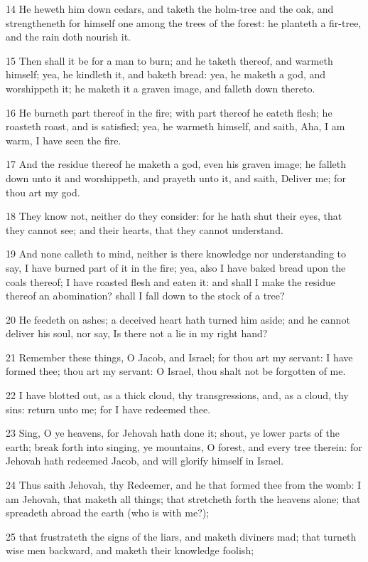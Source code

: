 \par 14 He heweth him down cedars, and taketh the holm-tree and the oak, and strengtheneth for himself one among the trees of the forest: he planteth a fir-tree, and the rain doth nourish it.
\par 15 Then shall it be for a man to burn; and he taketh thereof, and warmeth himself; yea, he kindleth it, and baketh bread: yea, he maketh a god, and worshippeth it; he maketh it a graven image, and falleth down thereto.
\par 16 He burneth part thereof in the fire; with part thereof he eateth flesh; he roasteth roast, and is satisfied; yea, he warmeth himself, and saith, Aha, I am warm, I have seen the fire.
\par 17 And the residue thereof he maketh a god, even his graven image; he falleth down unto it and worshippeth, and prayeth unto it, and saith, Deliver me; for thou art my god.
\par 18 They know not, neither do they consider: for he hath shut their eyes, that they cannot see; and their hearts, that they cannot understand.
\par 19 And none calleth to mind, neither is there knowledge nor understanding to say, I have burned part of it in the fire; yea, also I have baked bread upon the coals thereof; I have roasted flesh and eaten it: and shall I make the residue thereof an abomination? shall I fall down to the stock of a tree?
\par 20 He feedeth on ashes; a deceived heart hath turned him aside; and he cannot deliver his soul, nor say, Is there not a lie in my right hand?
\par 21 Remember these things, O Jacob, and Israel; for thou art my servant: I have formed thee; thou art my servant: O Israel, thou shalt not be forgotten of me.
\par 22 I have blotted out, as a thick cloud, thy transgressions, and, as a cloud, thy sins: return unto me; for I have redeemed thee.
\par 23 Sing, O ye heavens, for Jehovah hath done it; shout, ye lower parts of the earth; break forth into singing, ye mountains, O forest, and every tree therein: for Jehovah hath redeemed Jacob, and will glorify himself in Israel.
\par 24 Thus saith Jehovah, thy Redeemer, and he that formed thee from the womb: I am Jehovah, that maketh all things; that stretcheth forth the heavens alone; that spreadeth abroad the earth (who is with me?);
\par 25 that frustrateth the signs of the liars, and maketh diviners mad; that turneth wise men backward, and maketh their knowledge foolish;
